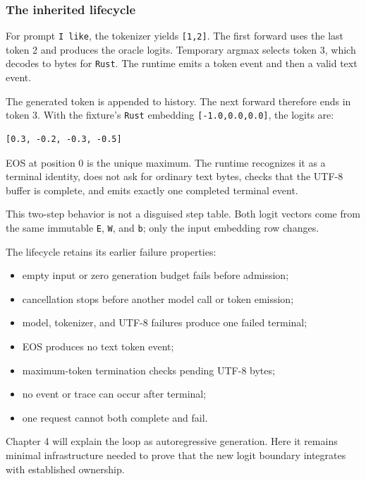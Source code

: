 \documentclass[
  10pt,
]{article}
\providecommand{\tightlist}{%
  \setlength{\itemsep}{0pt}\setlength{\parskip}{0pt}}
\begin{document}
\subsubsection{The inherited lifecycle}\label{the-inherited-lifecycle}

For prompt \texttt{I\ like}, the tokenizer yields \texttt{{[}1,2{]}}.
The first forward uses the last token 2 and produces the oracle logits.
Temporary argmax selects token 3, which decodes to bytes for
\texttt{Rust}. The runtime emits a token event and then a valid text
event.

The generated token is appended to history. The next forward therefore
ends in token 3. With the fixture's \texttt{Rust} embedding
\texttt{{[}-1.0,0.0,0.0{]}}, the logits are:

\begin{verbatim}
[0.3, -0.2, -0.3, -0.5]
\end{verbatim}

EOS at position 0 is the unique maximum. The runtime recognizes it as a
terminal identity, does not ask for ordinary text bytes, checks that the
UTF-8 buffer is complete, and emits exactly one completed terminal
event.

This two-step behavior is not a disguised step table. Both logit vectors
come from the same immutable \texttt{E}, \texttt{W}, and \texttt{b};
only the input embedding row changes.

The lifecycle retains its earlier failure properties:

\begin{itemize}
\tightlist
\item
  empty input or zero generation budget fails before admission;
\item
  cancellation stops before another model call or token emission;
\item
  model, tokenizer, and UTF-8 failures produce one failed terminal;
\item
  EOS produces no text token event;
\item
  maximum-token termination checks pending UTF-8 bytes;
\item
  no event or trace can occur after terminal;
\item
  one request cannot both complete and fail.
\end{itemize}

Chapter 4 will explain the loop as autoregressive generation. Here it
remains minimal infrastructure needed to prove that the new logit
boundary integrates with established ownership.
\end{document}
